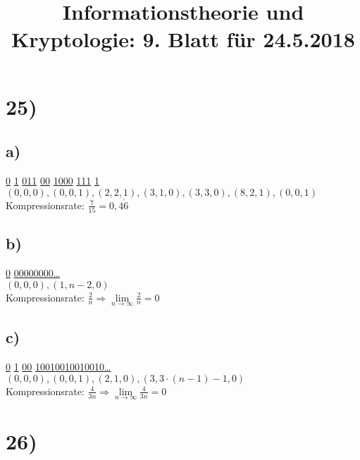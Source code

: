 %



  \title{Informationstheorie und Kryptologie: 9. Blatt für 24.5.2018}
  \maketitle

  \section*{25)}

    \subsection*{a)}

      \underline{0} \underline{1} \underline{011} \underline{00} \underline{1000} \underline{111} \underline{1} \\

      $(0,0,0), (0,0,1), (2,2,1), (3,1,0), (3,3,0), (8,2,1), (0,0,1)$\\

      Kompressionsrate: $\frac{7}{15} = 0,4\dot{6}$

    \subsection*{b)}

      \underline{0} \underline{00000000\ldots}\\

      $(0,0,0), (1,n-2,0)$\\

      Kompressionsrate: $\frac{2}{n} \Rightarrow \lim\limits_{n \rightarrow \infty}{\frac{2}{n}} = 0$

    \subsection*{c)}

      \underline{0} \underline{1} \underline{00} \underline{10010010010010\ldots}\\

      $(0,0,0), (0,0,1), (2,1,0), (3,3 \cdot (n - 1) - 1,0)$\\

      Kompressionsrate: $\frac{4}{3n} \Rightarrow \lim\limits_{n \rightarrow \infty}{\frac{4}{3n}} = 0$

  \section*{26)}

